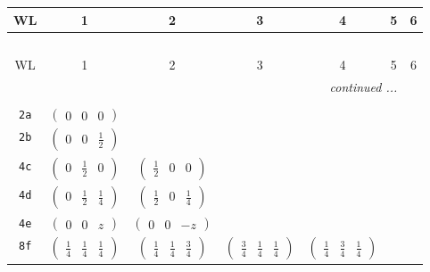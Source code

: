 \documentclass[fleqn,9pt,landscape]{jsarticle}
\begin{document}
\begin{center}
\renewcommand{\arraystretch}{1.2}
\begin{longtable}{ccccccc}
 \hline \hline
WL & 1 & 2 & 3 & 4 & 5 & 6 \\ \hline \endfirsthead

\multicolumn{6}{l}{\tablename\ \thetable{}} \\
 \hline \hline
WL & 1 & 2 & 3 & 4 & 5 & 6 \\ \hline \endhead

 \hline \hline
\multicolumn{6}{r}{\footnotesize\it continued ...} \\ \endfoot

 \hline \hline
\multicolumn{6}{r}{} \\ \endlastfoot

{\tt 2a} & $ \begin{pmatrix} 0 & 0 & 0 \end{pmatrix} $ & $  $ & $  $ & $  $ & $  $ & $  $ \\ \hline
{\tt 2b} & $ \begin{pmatrix} 0 & 0 & \frac{1}{2} \end{pmatrix} $ & $  $ & $  $ & $  $ & $  $ & $  $ \\ \hline
{\tt 4c} & $ \begin{pmatrix} 0 & \frac{1}{2} & 0 \end{pmatrix} $ & $ \begin{pmatrix} \frac{1}{2} & 0 & 0 \end{pmatrix} $ & $  $ & $  $ & $  $ & $  $ \\ \hline
{\tt 4d} & $ \begin{pmatrix} 0 & \frac{1}{2} & \frac{1}{4} \end{pmatrix} $ & $ \begin{pmatrix} \frac{1}{2} & 0 & \frac{1}{4} \end{pmatrix} $ & $  $ & $  $ & $  $ & $  $ \\ \hline
{\tt 4e} & $ \begin{pmatrix} 0 & 0 & z \end{pmatrix} $ & $ \begin{pmatrix} 0 & 0 & - z \end{pmatrix} $ & $  $ & $  $ & $  $ & $  $ \\ \hline
{\tt 8f} & $ \begin{pmatrix} \frac{1}{4} & \frac{1}{4} & \frac{1}{4} \end{pmatrix} $ & $ \begin{pmatrix} \frac{1}{4} & \frac{1}{4} & \frac{3}{4} \end{pmatrix} $ & $ \begin{pmatrix} \frac{3}{4} & \frac{1}{4} & \frac{1}{4} \end{pmatrix} $ & $ \begin{pmatrix} \frac{1}{4} & \frac{3}{4} & \frac{1}{4} \end{pmatrix} $ & $  $ & $  $ \\ \hline

\end{longtable}
\end{center}
\end{document}
